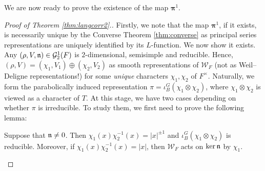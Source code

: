 We are now ready to prove the existence of the map $\bm\pi^1$.
\begin{proof}[Proof of Theorem \ref{thm:langcorr2}.]
    Firstly, we note that the map $\bm\pi^{1}$, if it exists, is necessarily unique by the Converse Theorem \ref{thm:converse} as principal series representations are uniquely identified by its $L$-function. We now show it exists. Any $(\rho,V,\mathfrak{n})\in\mathcal{G}_2^1(F)$ is $2$-dimensional, semisimple and reducible. Hence, $(\rho,V)=(\chi_1,V_1)\oplus(\chi_2,V_2)$ as smooth representations of $\mathcal{W}_F$ (not as Weil--Deligne representations!) for some \textit{unique} characters $\chi_1,\chi_2$ of $F^\times$. Naturally, we form the parabolically induced representation $\pi=\iota_B^G(\chi_1\otimes\chi_2)$, where $\chi_1\otimes\chi_2$ is viewed as a character of $T$. At this stage, we have two cases depending on whether $\pi$ is irreducible. To study them, we first need to prove the following lemma:
    \iffalse
    \begin{lemma}
        If $\pi=\iota_B^G(\chi_1\otimes\chi_2)$ is irreducible, then $\nn=0$.
    \end{lemma}
    \begin{proof}
        Suppose that $\nn\neq 0$. Since $\nn$ is nilpotent and $V$ is $2$-dimensional, $\nn^2=0$ and therefore $\dim_\CC\ker\nn=1$ and $\nn(V)=\ker\nn$. Moreover, we have seen in \eqref{eqn:Vnsubspace} that $\ker\nn$ carries a smooth representation $(\ker\nn,\rho_\nn)$ of $\mathcal{W}_F$. Since $\rho$ is semisimple, there is a $\mathcal{W}_F$-invariant subspace $W\leq V$ carrying a smooth representation $(W,\rho_W)$ such that $(V,\rho)=(\ker\nn,\rho_nn)\oplus(W,\rho_W)$. Both $\ker\nn$ and $W$ are $1$-dimensional, and therefore we may assume without loss of generality that $\rho_\nn=\chi_1$ and $\rho_W=\chi_2$. Under these assumptions, we note that for any $w\in W$, $\nn w\in\ker\nn$ and therefore
        $$\rho(x)\nn\rho(x)^{-1}w=\rho(x)\nn\chi^{-1}_2(x)w=\chi_1(x)\chi_2^{-1}(x)\nn w.$$
        By Definition \ref{defn:WeilDeligne} of a Weil--Deligne representation, it follows that $\chi_1(x)\chi_2^{-1}(x)=|x|$. By Theorem \ref{classify} on the classification of principal series representations, this means that $\pi$ is reducible, as desired.
    \end{proof}
    \fi
    \begin{lemma}
        Suppose that $\nn\neq0$. Then $\chi_1(x)\chi_2^{-1}(x)=|x|^{\pm1}$ and $\iota_B^G(\chi_1\otimes\chi_2)$ is reducible. Moreover, if $\chi_1(x)\chi_2^{-1}(x)=|x|$, then $\mathcal{W}_F$ acts on $\ker\nn$ by $\chi_1$.

\end{lemma}
\end{proof}
